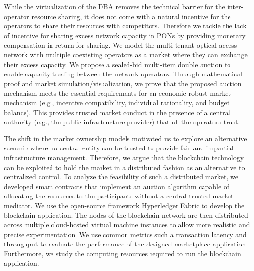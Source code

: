 While the virtualization of the \ac{DBA} removes the technical barrier for the inter-operator resource sharing, it does not come with a natural incentive for the operators to share their resources with competitors. Therefore we tackle the lack of incentive for sharing excess network capacity in \acp{PON} by providing monetary compensation in return for sharing. We model the multi-tenant optical access network with multiple coexisting operators as a market where they can exchange their excess capacity. We propose a sealed-bid multi-item double auction to enable capacity trading between the network operators. Through mathematical proof and market simulation/visualization, we prove that the proposed auction mechanism meets the essential requirements for an economic robust market mechanism (e.g., incentive compatibility, individual rationality, and budget balance). This provides trusted market conduct in the presence of a central authority (e.g., the public infrastructure provider) that all the operators trust. 

The shift in the market ownership models motivated us to explore an alternative scenario where no central entity can be trusted to provide fair and impartial infrastructure management. Therefore, we argue that the blockchain technology can be exploited to hold the market in a distributed fashion as an alternative to centralized control. To analyze the feasibility of such a distributed market, we developed smart contracts that implement an auction algorithm capable of allocating the resources to the participants without a central trusted market mediator. We use the open-source framework Hyperledger Fabric to develop the blockchain application. The nodes of the blockchain network are then distributed across multiple cloud-hosted virtual machine instances to allow more realistic and precise experimentation. We use common metrics such a transaction latency and throughput to evaluate the performance of the designed marketplace application. Furthermore, we study the computing resources required to run the blockchain application.



